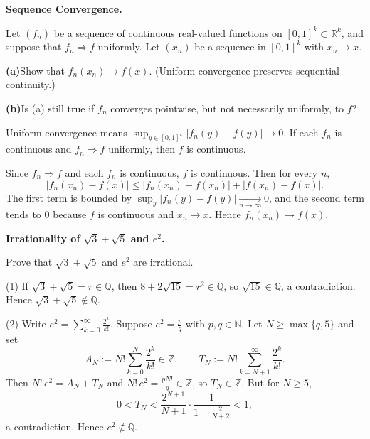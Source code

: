 \begin{problem}[CP-II-0016]
\label{prob:cp-ii-0016}
\textbf{Sequence Convergence.}

\hspace*{1.5em}Let $(f_n)$ be a sequence of continuous real-valued functions on $[0,1]^k\subset\mathbb{R}^k$, and suppose that $f_n \Rightarrow f$ uniformly. Let $(x_n)$ be a sequence in $[0,1]^k$ with $x_n\to x$.

\par\smallskip\noindent\textbf{(a)}\quad Show that $f_n(x_n)\to f(x)$. (Uniform convergence preserves sequential continuity.)
\par\smallskip\noindent\textbf{(b)}\quad Is (a) still true if $f_n$ converges pointwise, but not necessarily uniformly, to $f$?

Uniform convergence means $\sup_{y\in[0,1]^k}|f_n(y)-f(y)|\to 0$. If each $f_n$ is continuous and $f_n\Rightarrow f$ uniformly, then $f$ is continuous.
\end{problem}

\begin{solution}
Since $f_n\Rightarrow f$ and each $f_n$ is continuous, $f$ is continuous. Then for every $n$,
\[
|f_n(x_n)-f(x)|
\le |f_n(x_n)-f(x_n)| + |f(x_n)-f(x)|.
\]
The first term is bounded by $\sup_{y}|f_n(y)-f(y)|\xrightarrow[n\to\infty]{}0$, and the second term tends to $0$ because $f$ is continuous and $x_n\to x$. Hence $f_n(x_n)\to f(x)$.
\end{solution}

\begin{problem}[CP-II-0019]
\label{prob:cp-ii-0019}
\textbf{Irrationality of $\sqrt3+\sqrt5$ and $e^2$.}

\hspace*{1.5em}Prove that $\sqrt3+\sqrt5$ and $e^2$ are irrational.
\end{problem}

\begin{solution}
(1) If $\sqrt3+\sqrt5=r\in\mathbb Q$, then
$8+2\sqrt{15}=r^2\in\mathbb Q$, so $\sqrt{15}\in\mathbb Q$, a contradiction.
Hence $\sqrt3+\sqrt5\notin\mathbb Q$.

(2) Write $e^2=\sum_{k=0}^\infty \frac{2^k}{k!}$. Suppose $e^2=\frac pq$ with $p,q\in\mathbb N$.
Let $N\ge\max\{q,5\}$ and set
\[
A_N:=N!\sum_{k=0}^{N}\frac{2^k}{k!}\in\mathbb Z,\qquad
T_N:=N!\sum_{k=N+1}^{\infty}\frac{2^k}{k!}.
\]
Then $N!\,e^2=A_N+T_N$ and $N!\,e^2=\frac{pN!}{q}\in\mathbb Z$, so $T_N\in\mathbb Z$.
But for $N\ge5$,
\[
0<T_N<\frac{2^{N+1}}{N+1}\cdot\frac{1}{1-\frac{2}{N+2}}<1,
\]
a contradiction. Hence $e^2\notin\mathbb Q$.

\bigskip
\end{solution}


